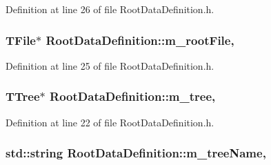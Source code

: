 Definition at line 26 of file Root\+Data\+Definition.\+h.

\hypertarget{classRootDataDefinition_af00a892a1b940abf9265066391b67304}{
\subsubsection[{m\+\_\+root\+File}]{\setlength{\rightskip}{0pt plus 5cm}T\+File$\ast$ Root\+Data\+Definition\+::m\+\_\+root\+File\hspace{0.3cm}{\ttfamily [protected]}, {\ttfamily [inherited]}}}\label{classRootDataDefinition_af00a892a1b940abf9265066391b67304}


Definition at line 25 of file Root\+Data\+Definition.\+h.

\hypertarget{classRootDataDefinition_a941ec585a2aa533bc30889a382e54f50}{
\subsubsection[{m\+\_\+tree}]{\setlength{\rightskip}{0pt plus 5cm}T\+Tree$\ast$ Root\+Data\+Definition\+::m\+\_\+tree\hspace{0.3cm}{\ttfamily [protected]}, {\ttfamily [inherited]}}}\label{classRootDataDefinition_a941ec585a2aa533bc30889a382e54f50}


Definition at line 22 of file Root\+Data\+Definition.\+h.

\hypertarget{classRootDataDefinition_a46394bbb1863baa4abcd8cbd0413fa88}{
\subsubsection[{m\+\_\+tree\+Name}]{\setlength{\rightskip}{0pt plus 5cm}std\+::string Root\+Data\+Definition\+::m\+\_\+tree\+Name\hspace{0.3cm}{\ttfamily [protected]}, {\ttfamily [inherited]}}}\label{classRootDataDefinition_a46394bbb1863baa4abcd8cbd0413fa88}


